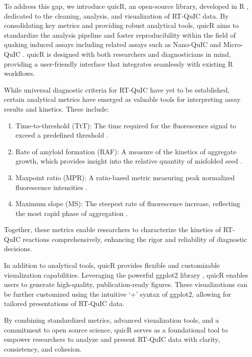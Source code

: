 \documentclass[preprint,12pt,a4paper]{elsarticle}
\begin{document}
        To address this gap, we introduce quicR, an open-source library, developed in R \cite{R2024}, dedicated to the cleaning, analysis, and visualization of RT-QuIC data. By consolidating key metrics and providing robust analytical tools, quicR aims to standardize the analysis pipeline and foster reproducibility within the field of quaking induced assays including related assays such as Nano-QuIC \cite{Christenson2023} and Micro-QuIC \cite{Lee2024}. quicR is designed with both researchers and diagnosticians in mind, providing a user-friendly interface that integrates seamlessly with existing R workflows.

        While universal diagnostic criteria for RT-QuIC have yet to be established, certain analytical metrics have emerged as valuable tools for interpreting assay results and kinetics. These include:

        \begin{enumerate}
            \item Time-to-threshold (TtT): The time required for the fluorescence signal to exceed a predefined threshold \cite{Orru2015}.
            \item Rate of amyloid formation (RAF): A measure of the kinetics of aggregate growth, which provides insight into the relative quantity of misfolded seed \cite{Gallups2022}.
            \item Maxpoint ratio (MPR): A ratio-based metric measuring peak normalized fluorescence intensities \cite{Rowden2023}.
            \item Maximum slope (MS): The steepest rate of fluorescence increase, reflecting the most rapid phase of aggregation \cite{Henderson2015}.
        \end{enumerate}

        Together, these metrics enable researchers to characterize the kinetics of RT-QuIC reactions comprehensively, enhancing the rigor and reliability of diagnostic decisions.

        In addition to analytical tools, quicR provides flexible and customizable visualization capabilities. Leveraging the powerful ggplot2 library \cite{ggplot2016}, quicR enables users to generate high-quality, publication-ready figures. These visualizations can be further customized using the intuitive `+' syntax of ggplot2, allowing for tailored presentations of RT-QuIC data.

        By combining standardized metrics, advanced visualization tools, and a commitment to open source science, quicR serves as a foundational tool to empower researchers to analyze and present RT-QuIC data with clarity, consistency, and cohesion.
\end{document}

